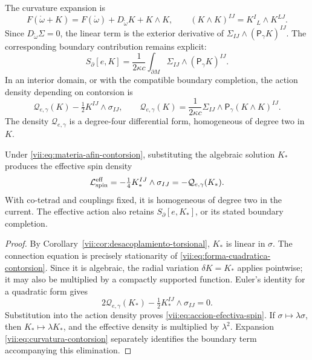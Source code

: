 The curvature expansion is
\begin{equation}
 F(\mathring\omega+K)
 =F(\mathring\omega)+D_{\mathring\omega}K+K\wedge K,
 \qquad (K\wedge K)^{IJ}=K^I{}_{L}\wedge K^{LJ}.
 \label{vii:eq:curvatura-contorsion}
\end{equation}
Since \(D_{\mathring\omega}\Sigma=0\), the linear term is the
exterior derivative of \(\Sigma_{IJ}\wedge(\mathsf P_\gamma K)^{IJ}\).
The corresponding boundary contribution remains explicit:
\begin{equation}
 S_\partial[e,K]=\frac1{2\kappa c}
     \int_{\partial M}\Sigma_{IJ}\wedge(\mathsf P_\gamma K)^{IJ}.
 \label{vii:eq:borde-contorsion}
\end{equation}
In an interior domain, or with the compatible boundary completion,
the action density depending on contorsion is
\begin{equation}
 \mathcal Q_{e,\gamma}(K)-\tfrac12K^{IJ}\wedge\sigma_{IJ},
 \qquad
 \mathcal Q_{e,\gamma}(K)
  =\frac1{2\kappa c}\Sigma_{IJ}\wedge
                         \mathsf P_\gamma(K\wedge K)^{IJ}.
 \label{vii:eq:forma-cuadratica-contorsion}
\end{equation}
The density \(\mathcal Q_{e,\gamma}\) is a degree-four differential
form, homogeneous of degree two in \(K\).

\begin{theorem}
\label{vii:thm:respuesta-cuadratica}
Under \eqref{vii:eq:materia-afin-contorsion}, substituting the
algebraic solution \(K_*\) produces the effective spin density
\begin{equation}
 \mathcal L_{\rm spin}^{\rm eff}
 =-\tfrac14 K_*^{IJ}\wedge\sigma_{IJ}
 =-\mathcal Q_{e,\gamma}(K_*).
 \label{vii:eq:accion-efectiva-spin}
\end{equation}
With co-tetrad and couplings fixed, it is homogeneous of degree two
in the current. The effective action also retains
\(S_\partial[e,K_*]\), or its stated boundary completion.
\end{theorem}
\begin{proof}
By Corollary~\ref{vii:cor:desacoplamiento-torsional},
\(K_*\) is linear in \(\sigma\). The connection equation is
precisely stationarity of
\eqref{vii:eq:forma-cuadratica-contorsion}. Since it is algebraic,
the radial variation \(\delta K=K_*\) applies pointwise;
it may also be multiplied by a compactly supported function.
Euler's identity for a quadratic form gives
\[
 2\mathcal Q_{e,\gamma}(K_*)
             -\tfrac12K_*^{IJ}\wedge\sigma_{IJ}=0.
\]
Substitution into the action density proves
\eqref{vii:eq:accion-efectiva-spin}. If
\(\sigma\mapsto\lambda\sigma\), then
\(K_*\mapsto\lambda K_*\), and the effective density is multiplied
by \(\lambda^2\). Expansion
\eqref{vii:eq:curvatura-contorsion} separately identifies the
boundary term accompanying this elimination.
\end{proof}

